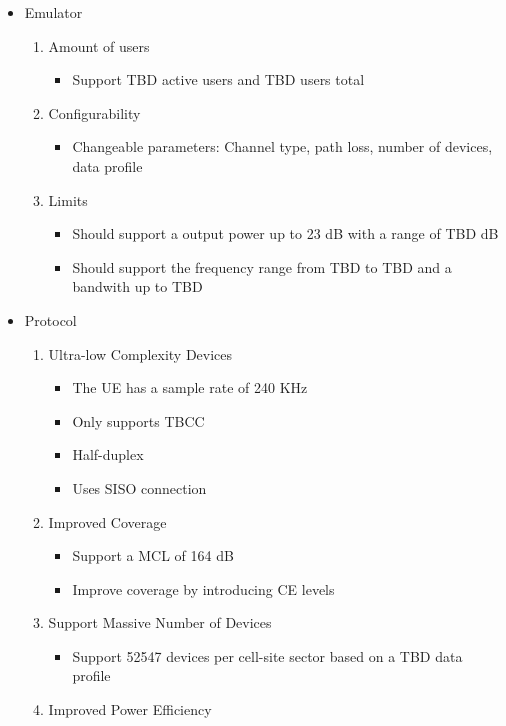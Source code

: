 \begin{itemize}
\item Emulator
	\begin{enumerate}
	\item Amount of users %
		\begin{itemize}
		\item Support TBD active users and TBD users total
		\end{itemize}
	\item Configurability  %
		\begin{itemize}
		\item Changeable parameters: Channel type, path loss, number of devices, data profile
		\end{itemize}
	\item Limits 
		\begin{itemize}
		\item Should support a output power up to 23 dB with a range of TBD dB
		\item Should support the frequency range from TBD to TBD and a bandwith up to TBD
		\end{itemize}
	\end{enumerate}
\item Protocol
	\begin{enumerate}[resume]
	\item  Ultra-low Complexity Devices
		\begin{itemize}
		\item The \gls{UE} has a sample rate of 240 KHz
		\item Only supports \gls{TBCC}
		\item Half-duplex
		\item Uses \gls{SISO} connection
		\end{itemize}
	\item Improved Coverage
		\begin{itemize}
		\item Support a \gls{MCL} of 164 dB
		\item Improve coverage by introducing \gls{CE} levels 
		\end{itemize}
	\item Support Massive Number of Devices 
		\begin{itemize}
		\item Support 52547 devices per cell-site sector based on a TBD data profile
		\end{itemize}
	\item Improved Power Efficiency

\end{enumerate}
\end{itemize}
